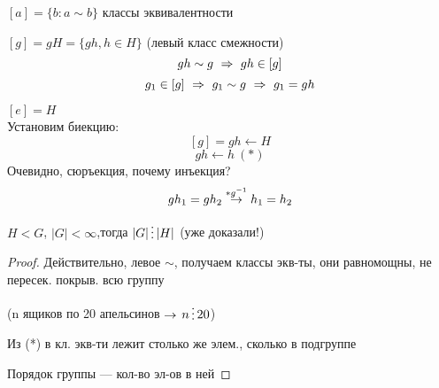 \documentclass[main]{subfiles}
\begin{document}
    \begin{definition}
        $[a] = \{b:a  \sim b\}$ классы эквивалентности
    \end{definition}

    \begin{definition}
        $[g] = g H = \{g h, h \in H \}$ (левый класс смежности)
        \[g h \sim g \ \Rightarrow\  g h \in [g]\]
        \[g_1 \in [g] \ \Rightarrow\  g_1 \sim g \ \Rightarrow\  g_1 = g h\]
    \end{definition}

    \begin{utv}
        $[e]=H$\\
        Установим биекцию:
        \[[g]=gh \leftarrow H\]
        \[gh \leftarrow h \ (*)\]
        Очевидно, сюръекция, почему инъекция?
        \[g h_1 = g h_2 \overset{*g^{-1}}{\rightarrow} h_1 = h_2\]
    \end{utv}

    \begin{theorem}[Лагранжа]
        $H < G$, \q $|G| < \infty$,\q тогда $|G| \devides |H|$ (уже доказали!)
    \end{theorem}

    \begin{proof}
        Действительно, левое $\sim$, получаем классы экв-ты, они равномощны, не пересек. покрыв. всю группу

        (n ящиков по 20 апельсинов $\rightarrow$ $n \devides 20$)

        Из (*) в кл. экв-ти лежит столько же элем., сколько в подгруппе

        Порядок группы --- кол-во эл-ов в ней
    \end{proof}
\end{document}
